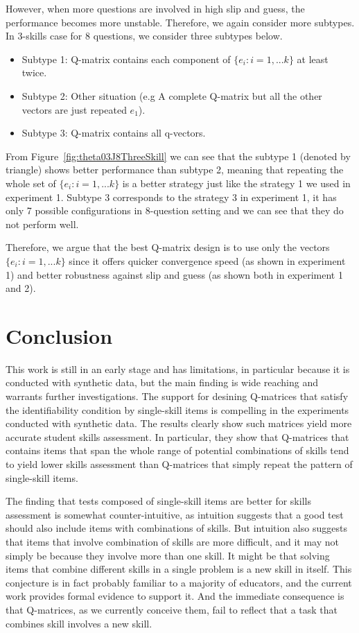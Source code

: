 \documentclass{edm_template}
\begin{document}
However, when more questions are involved in high slip and guess, the performance becomes more unstable. Therefore, we again consider more subtypes. In 3-skills case for 8 questions, we consider three subtypes below. 
\begin{itemize}
\item Subtype 1: Q-matrix contains each component of $\{e_{i}:i=1,...k\}$ at least twice. 
\item Subtype 2: Other situation (e.g A complete Q-matrix but all the other vectors are just repeated $e_1$).
\item Subtype 3: Q-matrix contains all q-vectors.
\end{itemize}
From Figure~\ref{fig:theta03J8ThreeSkill} we can see that the subtype 1 (denoted by triangle) shows better performance than subtype 2, meaning that repeating the whole set of $\{e_{i}:i=1,...k\}$ is a better strategy just like the strategy 1 we used in experiment 1. Subtype 3 corresponds to the strategy 3 in experiment 1, it has only 7 possible configurations in 8-question setting and we can see that they do not perform well.

Therefore, we argue that the best Q-matrix design is to use only the vectors $\{e_{i}:i=1,...k\}$ since it offers quicker convergence speed (as shown in experiment 1) and better robustness against slip and guess (as shown both in experiment 1 and 2).

\section{Conclusion}

This work is still in an early stage and has limitations, in particular because it is conducted with synthetic data, but the main finding is wide reaching and warrants further investigations.  The support for desining Q-matrices that satisfy the identifiability condition by single-skill items is compelling in the experiments conducted with synthetic data.  The results clearly show such matrices yield more accurate student skills assessment. In particular, they show that Q-matrices that contains items that span the whole range of potential combinations of skills tend to yield lower skills assessment than Q-matrices that simply repeat the pattern of single-skill items.

The finding that tests composed of single-skill items are better for skills assessment is somewhat counter-intuitive, as intuition suggests that a good test should also include items with combinations of skills.  But intuition also suggests that items that involve combination of skills are more difficult, and it may not simply be because they involve more than one skill.  It might be that solving items that combine different skills in a single problem is a new skill in itself.  This conjecture is in fact probably familiar to a majority of educators, and the current work provides formal evidence to support it.  And the immediate consequence is that Q-matrices, as we currently conceive them, fail to reflect that a task that combines skill involves a new skill.
\end{document}
